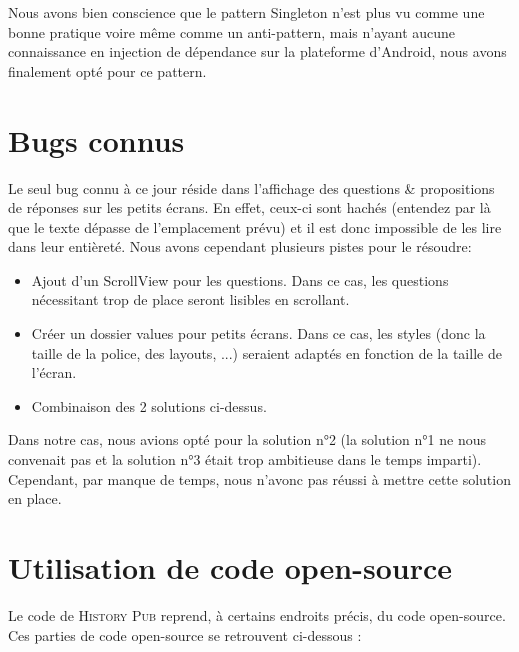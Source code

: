 \documentclass[11pt]{scrreprt}
\begin{document}
    Nous avons bien conscience que le pattern Singleton n'est plus vu comme une bonne pratique voire même comme un anti-pattern, mais n'ayant aucune connaissance en injection de dépendance sur la plateforme d'Android, nous avons finalement opté pour ce pattern.

    \chapter{Bugs connus}
    Le seul bug connu à ce jour réside dans l'affichage des questions & propositions de réponses sur les petits écrans. En effet, ceux-ci sont hachés (entendez par là que le texte dépasse de l'emplacement prévu) et il est donc impossible de les lire dans leur entièreté.
    Nous avons cependant plusieurs pistes pour le résoudre:
     \begin{itemize}
         \item Ajout d'un ScrollView pour les questions. Dans ce cas, les questions nécessitant trop de place seront lisibles en scrollant.
         \item Créer un dossier values pour petits écrans. Dans ce cas, les styles (donc la taille de la police, des layouts, ...) seraient adaptés en fonction de la taille de l'écran.
         \item Combinaison des 2 solutions ci-dessus.
     \end{itemize}
     Dans notre cas, nous avions opté pour la solution n°2 (la solution n°1 ne nous convenait pas et la solution n°3 était trop ambitieuse dans le temps imparti). Cependant, par manque de temps, nous n'avonc pas réussi à mettre cette solution en place.

    \chapter{Utilisation de code open-source}
    Le code de \textsc{History Pub} reprend, à certains endroits précis, du code open-source. Ces parties de code open-source se retrouvent ci-dessous :
\end{document}
